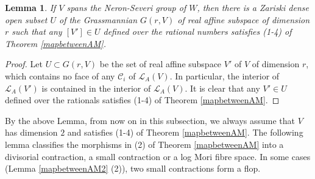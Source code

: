 \documentclass[11pt]{amsart}
\newtheorem{lem}[defn]{Lemma}
\begin{document}
\begin{lem}\label{subspace}
  \cite[Corollary 3.4]{haconSarkisovProgram2012} If $V$ spans the Neron-Severi group of $W$, then there is a Zariski dense open subset $U$ of the Grassmannian $G(r,V)$ of real affine subspace of dimension $r$ such that any  $[V']\in U$ defined over the rational numbers satisfies (1-4) of Theorem \ref{mapbetweenAM}. 
\end{lem}

\begin{proof}
 Let $U \subset G(r,V) $ be the set of real affine subspace  $V'$ of $V$ of dimension $r$, which contains no face of any $\mathcal{C}_{i}$ of $\mathcal{L}_A(V)$. In particular, the interior of  $\mathcal{L}_{A}(V')$ is contained in the interior of $\mathcal{L}_{A}(V)$. It is clear that any $V'\in U$ defined over the rationals satisfies (1-4) of Theorem \ref{mapbetweenAM}. 
\end{proof}

By the above Lemma, from now on in this subsection, we always assume that $V$ has dimension $2$ and satisfies (1-4) of Theorem \ref{mapbetweenAM}. The following lemma classifies  the morphisms in (2) of Theorem \ref{mapbetweenAM} into a divisorial contraction, a small contraction or a log Mori fibre space. In some cases (Lemma \ref{mapbetweenAM2} (2)), two small contractions form a flop.
\end{document}
